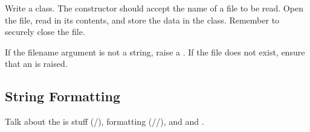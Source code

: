 \begin{problem}
Write a  class.
The constructor should accept the name of a file to be read.
Open the file, read in its contents, and store the data in the class.
Remember to securely close the file.

If the filename argument is not a string, raise a .
If the file does not exist, ensure that an  is raised.
\end{problem}

\subsection*{String Formatting}

Talk about the is stuff (/), formatting (//), and  and . 

